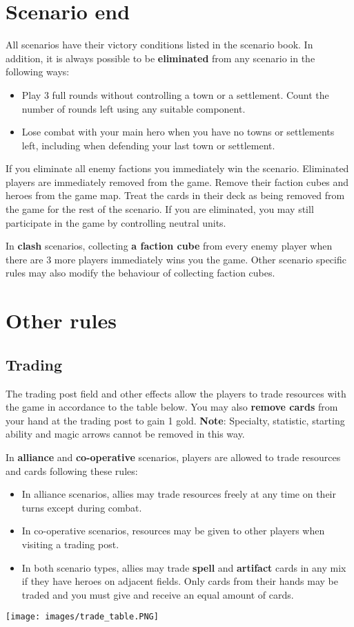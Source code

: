\documentclass[12pt]{article}
\begin{document}
\section[Scenario end]{Scenario end\hypertarget{End}{}}
All scenarios have their victory conditions listed in the scenario book. In addition, it is always possible to be \textbf{eliminated} from any scenario in the following ways:
\begin{itemize}
    \item Play 3 full rounds without controlling a town or a settlement. Count the number of rounds left using any suitable component.
    \item Lose combat with your main hero when you have no towns or settlements left, including when defending your last town or settlement.
\end{itemize}
If you eliminate all enemy factions you immediately win the scenario. Eliminated players are immediately removed from the game. Remove their faction cubes and heroes from the game map. Treat the cards in their deck as being removed from the game for the rest of the scenario. If you are eliminated, you may still participate in the game by controlling neutral units.\par
In \textbf{clash} scenarios, collecting \textbf{a faction cube} from every enemy player when there are 3 more players immediately wins you the game. Other scenario specific rules may also modify the behaviour of collecting faction cubes.
\clearpage

\section{Other rules}
\subsection*{\hypertarget{Trading}{Trading}}
The trading post field and other effects allow the players to trade resources with the game in accordance to the table below. You may also \textbf{remove cards} from your hand at the trading post to gain 1 gold. \textbf{Note}: Specialty, statistic, starting ability and magic arrows cannot be removed in this way.\par
In \textbf{alliance} and \textbf{co-operative} scenarios, players are allowed to trade resources and cards following these rules:
\begin{itemize}
    \item In alliance scenarios, allies may trade resources freely at any time on their turns except during combat.
    \item In co-operative scenarios, resources may be given to other players when visiting a trading post.
    \item In both scenario types, allies may trade \textbf{spell} and \textbf{artifact} cards in any mix if they have heroes on adjacent fields. Only cards from their hands may be traded and you must give and receive an equal amount of cards.
\end{itemize}
\begin{center}
\texttt{[image: images/trade\_table.PNG]}
\end{center}
\clearpage
\end{document}
